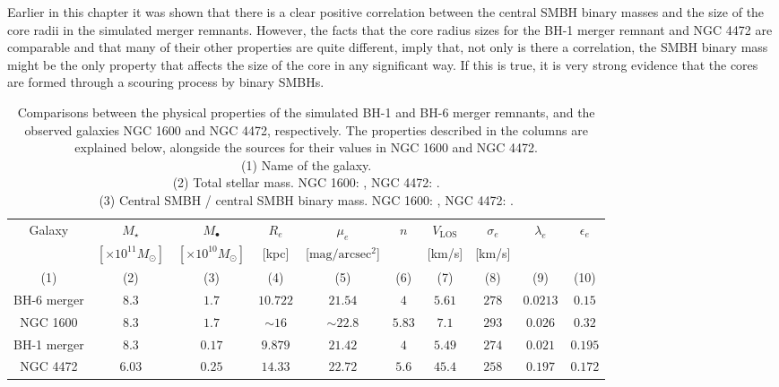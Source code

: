 \documentclass[english, twoside]{HYgradu}
\begin{document}
Earlier in this chapter it was shown that there is a clear positive correlation between the central SMBH binary masses and the size of the core radii in the simulated merger remnants. However, the facts that the core radius sizes for the BH-1 merger remnant and NGC 4472 are comparable and that many of their other properties are quite different, imply that, not only is there a correlation, the SMBH binary mass might be the only property that affects the size of the core in any significant way. If this is true, it is very strong evidence that the cores are formed through a scouring process by binary SMBHs.


\begin{table}
	\begin{center}
		\scriptsize
		\begin{tabular}{c c c c c c c c c c}
		\hline
		\hline
		Galaxy & $M_\star$ & $M_\bullet$ & $R_e$ & $\mu_e$ & $n$ & 
		$V_\mathrm{LOS}$ & $\sigma_e$ & $\lambda_e$ &
		$\epsilon_e$ \\
		& $[\times 10^{11} M_\odot]$ & $[\times 10^{10} M_\odot]$ &
		[kpc] & [$\mathrm{mag/arcsec^2}$] & & [km/s] & [km/s] & & \\
		(1) & (2) & (3) & (4) & (5) & (6) & (7) & (8) & (9) & (10) \\
		\hline
		BH-6 merger & $8.3$ & $1.7$ & $10.722$ & $21.54$ & $4$ & $5.61$ & $278$ & $0.0213$ & $0.15$ \\
		NGC 1600 & $8.3$ & $1.7$ & $\sim 16$ & $\sim 22.8$ & $5.83$ & $7.1$ & $293$ & $0.026$ & $0.32$ \\
		\hdashline
		BH-1 merger & $8.3$ & $0.17$ & $9.879$ & $21.42$ & $4$ & $5.49$ & $274$ & $0.021$ & $0.195$ \\
		NGC 4472 & $6.03$ & $0.25$ & $14.33$ & $22.72$ & $5.6$ & $45.4$ & 
		$258$ & $0.197$ & $0.172$ \\
		\hline
		\end{tabular}
	\end{center}
	\caption{Comparisons between the physical properties of the simulated BH-1 and BH-6 merger remnants, and the observed galaxies NGC 1600 and NGC 4472, respectively. The properties described in the columns are explained below, alongside the sources for their values in NGC 1600 and NGC 4472. \\
	(1) Name of the galaxy. \\
	(2) Total stellar mass. NGC 1600: \cite{Thomas2016}, NGC 4472: \cite{Veale2018lambda}. \\
	(3) Central SMBH / central SMBH binary mass. NGC 1600:  \cite{Thomas2016}, NGC 4472: \cite{Rusli2013_BHmass}. \\
}
\end{table}
\end{document}
